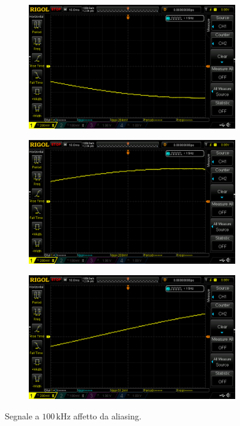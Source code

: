 \documentclass[a4paper]{article}
\begin{document}
				\begin{figure}[h!]
					\centering
					\begin{subfigure}{0.4\textwidth}
						\centering
						\includegraphics[scale=0.2]{aliasing100kHz_1}
					\end{subfigure}
					\begin{subfigure}{0.4\textwidth}
						\centering
						\includegraphics[scale=0.2]{aliasing100kHz_2}
					\end{subfigure}
					\newline
					\centering
					\begin{subfigure}{0.4\textwidth}
						\centering
						\includegraphics[scale=0.2]{aliasing100kHz_3}
					\end{subfigure}
					\caption{Segnale a $ 100 \, \mathrm{kHz} $ affetto da aliasing.}
					\label{fig:aliasing100kHz}
				\end{figure}
\end{document}
